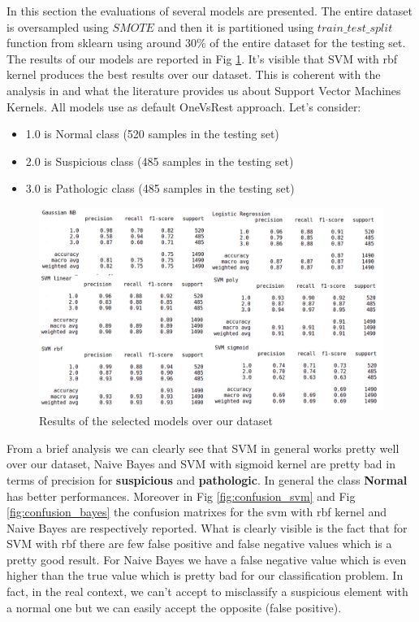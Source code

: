 \documentclass[a4paper,12pt]{article}
\begin{document}
In this section the evaluations of several models are presented. The entire dataset is oversampled using $SMOTE$ and then it is partitioned using $train\_test\_split$ function from sklearn using around 30\% of the entire dataset for the testing set. 
The results of our models are reported in Fig \ref{fig:fulldataset}. It's visible that SVM with rbf kernel produces the best results over our dataset. This is coherent with the analysis in \cite{ml} and what the literature provides us about Support Vector Machines Kernels. All models use as default OneVsRest approach. Let's consider:
\bigbreak
\begin{itemize}
  \item 1.0 is Normal class (520 samples in the testing set)
  \item 2.0 is Suspicious class (485 samples in the testing set)
  \item 3.0 is Pathologic class (485 samples in the testing set)
\end{itemize} 

\begin{figure}[H]
  \begin{center}
  \includegraphics[width=1.0\textwidth]{images/fulldataset.png}
  \end{center}
  \caption{Results of the selected models over our dataset}
  \label{fig:fulldataset}
\end{figure}

\noindent From a brief analysis we can clearly see that SVM in general works pretty well over our dataset, Naive Bayes and SVM with sigmoid kernel are pretty bad in terms of precision for \textbf{suspicious} and \textbf{pathologic}. In general the class \textbf{Normal} has better performances. Moreover in Fig \ref{fig:confusion_svm} and Fig \ref{fig:confusion_bayes} the confusion matrixes for the svm with rbf kernel and Naive Bayes are respectively reported. What is clearly visible is the fact that for SVM with rbf there are few false positive and false negative values which is a pretty good result. For Naive Bayes we have a false negative value which is even higher than the true value which is pretty bad for our classification problem. In fact, in the real context, we can't accept to misclassify a suspicious element with a normal one but we can easily accept the opposite (false positive).
\end{document}
